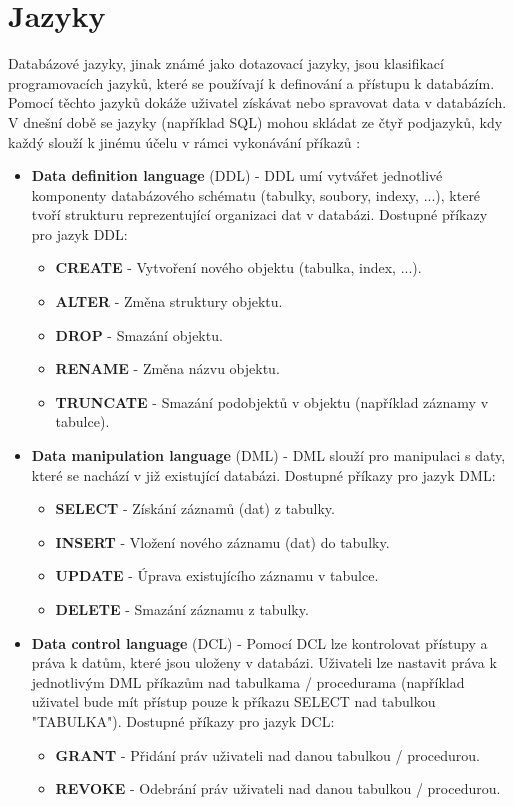 \section{Jazyky} \label{sec:jazyky}
Databázové jazyky, jinak známé jako dotazovací jazyky, jsou klasifikací programovacích jazyků, které se používají k definování a přístupu k databázím. Pomocí těchto jazyků dokáže uživatel získávat nebo spravovat data v databázích. V dnešní době se jazyky (například \gls{SQL}) mohou skládat ze čtyř podjazyků, kdy každý slouží k jinému účelu v rámci vykonávání příkazů \cite{indeedDBLanguage, begginersBookDBLanguage}:
\begin{itemize}
\item \textbf{Data definition language} (DDL) - DDL umí vytvářet jednotlivé komponenty databázového schématu (tabulky, soubory, indexy, ...), které tvoří strukturu reprezentující organizaci dat v databázi. Dostupné příkazy pro jazyk DDL:
	\begin{itemize}
	\item \textbf{CREATE} - Vytvoření nového objektu (tabulka, index, ...).
	\item \textbf{ALTER} - Změna struktury objektu.
	\item \textbf{DROP} - Smazání objektu.
	\item \textbf{RENAME} - Změna názvu objektu.
	\item \textbf{TRUNCATE} - Smazání podobjektů v objektu (například záznamy v tabulce).
	\end{itemize}
\item \textbf{Data manipulation language} (DML) - DML slouží pro manipulaci s daty, které se nachází v již existující databázi. Dostupné příkazy pro jazyk DML:
	\begin{itemize}
	\item \textbf{SELECT} - Získání záznamů (dat) z tabulky.
	\item \textbf{INSERT} - Vložení nového záznamu (dat) do tabulky.
	\item \textbf{UPDATE} - Úprava existujícího záznamu v tabulce.
	\item \textbf{DELETE} - Smazání záznamu z tabulky.
	\end{itemize}
\item \textbf{Data control language} (DCL) - Pomocí DCL lze kontrolovat přístupy a práva k datům, které jsou uloženy v databázi. Uživateli lze nastavit práva k jednotlivým DML příkazům nad tabulkama / procedurama (například uživatel bude mít přístup pouze k příkazu SELECT nad tabulkou "TABULKA"). Dostupné příkazy pro jazyk DCL:
	\begin{itemize}
	\item \textbf{GRANT} - Přidání práv uživateli nad danou tabulkou / procedurou. 
	\item \textbf{REVOKE} - Odebrání práv uživateli nad danou tabulkou / procedurou.
	\end{itemize}


\end{itemize}
